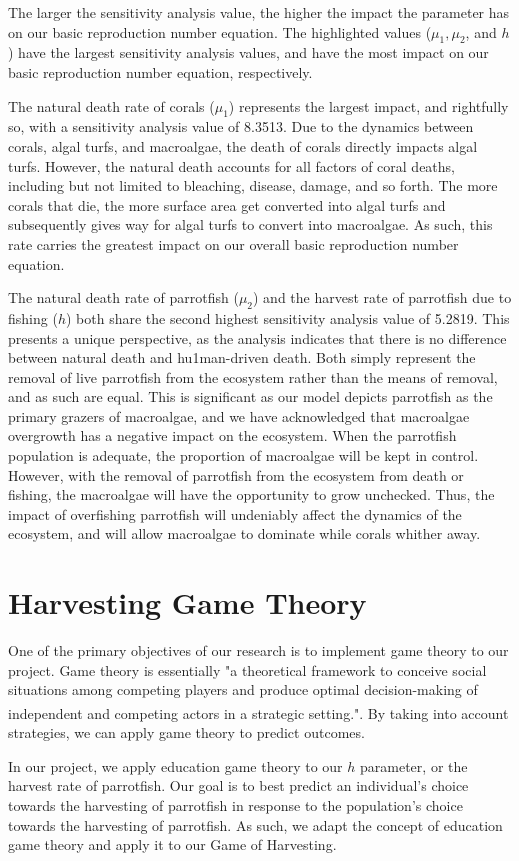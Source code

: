 \documentclass[12pt]{article}
\begin{document}
    The larger the sensitivity analysis value, the higher the impact the parameter has on our basic reproduction number equation. The highlighted values ($\mu_{1}, \mu_{2}$, and $h$) have the largest sensitivity analysis values, and have the most impact on our basic reproduction number equation, respectively. \par
    The natural death rate of corals ($\mu_{1}$) represents the largest impact, and rightfully so, with a sensitivity analysis value of 8.3513. Due to the dynamics between corals, algal turfs, and macroalgae, the death of corals directly impacts algal turfs. However, the natural death accounts for all factors of coral deaths, including but not limited to bleaching, disease, damage, and so forth. The more corals that die, the more surface area get converted into algal turfs and subsequently gives way for algal turfs to convert into macroalgae. As such, this rate carries the greatest impact on our overall basic reproduction number equation. \par
    The natural death rate of parrotfish ($\mu_{2}$) and the harvest rate of parrotfish due to fishing ($h$) both share the second highest sensitivity analysis value of 5.2819. This presents a unique perspective, as the analysis indicates that there is no difference between natural death and hu1man-driven death. Both simply represent the removal of live parrotfish from the ecosystem rather than the means of removal, and as such are equal. This is significant as our model depicts parrotfish as the primary grazers of macroalgae, and we have acknowledged that macroalgae overgrowth has a negative impact on the ecosystem. When the parrotfish population is adequate, the proportion of macroalgae will be kept in control. However, with the removal of parrotfish from the ecosystem from death or fishing, the macroalgae will have the opportunity to grow unchecked. Thus, the impact of overfishing parrotfish will undeniably affect the dynamics of the ecosystem, and will allow macroalgae to dominate while corals whither away.
    
\section{Harvesting Game Theory}
One of the primary objectives of our research is to implement game theory to our project. Game theory is essentially "a theoretical framework to conceive social situations among competing players and produce optimal decision-making of independent and competing actors in a strategic setting."\textsuperscript{\cite{game_theory_definition}}. By taking into account strategies, we can apply game theory to predict outcomes. \par
In our project, we apply education game theory to our $h$ parameter, or the harvest rate of parrotfish. Our goal is to best predict an individual's choice towards the harvesting of parrotfish in response to the population's choice towards the harvesting of parrotfish. As such, we adapt the concept of education game theory and apply it to our Game of Harvesting. 
\end{document}
